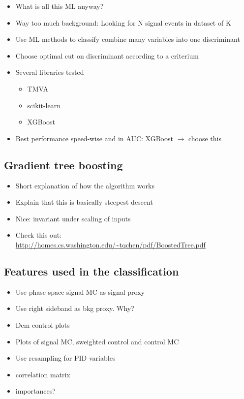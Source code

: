 \begin{itemize}
  \item What is all this ML anyway?
  \item Way too much background: Looking for N signal events in dataset of K
  \item Use ML methods to classify combine many variables into one discriminant
  \item Choose optimal cut on discriminant according to a criterium
  \item Several libraries tested
    \begin{itemize}
      \item TMVA
      \item scikit-learn
      \item XGBoost
    \end{itemize}
  \item Best performance speed-wise and in AUC: XGBoost $\rightarrow$ choose this
\end{itemize}

\subsection{Gradient tree boosting}

\begin{itemize}
  \item Short explanation of how the algorithm works
  \item Explain that this is basically steepest descent 
  \item Nice: invariant under scaling of inputs
  \item Check this out: \url{http://homes.cs.washington.edu/~tqchen/pdf/BoostedTree.pdf}
\end{itemize}

\subsection{Features used in the classification}

\begin{itemize}
  \item Use phase space signal MC as signal proxy
  \item Use right sideband as bkg proxy. Why?
  \item Dem control plots
  \item Plots of signal MC, sweighted control and control MC
  \item Use resampling for PID variables
  \item correlation matrix
  \item importances?
\end{itemize}

